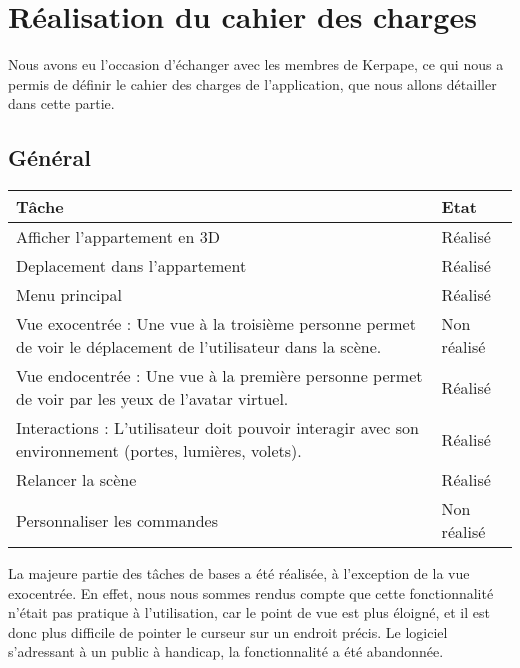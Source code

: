 \section{Réalisation du cahier des charges}
Nous avons eu l'occasion d'échanger avec les membres de Kerpape, ce qui nous a permis de définir le cahier des charges de l'application, que nous allons détailler dans cette partie.

\subsection{Général}
\begin{tabular}{|p{}|p{}|}
	\hline
	Tâche & Etat \\ \hline
	Afficher l'appartement en 3D & Réalisé \\ \hline
	Deplacement dans l'appartement & Réalisé \\ \hline
	Menu principal & Réalisé \\ \hline
	Vue exocentrée : Une vue à la troisième personne permet de voir le déplacement de l'utilisateur dans la scène. & Non réalisé \\ \hline
	Vue endocentrée : Une vue à la première personne permet de voir par les yeux de l'avatar  virtuel. & Réalisé \\ \hline
	Interactions : L'utilisateur doit pouvoir interagir avec son environnement (portes, lumières, volets). & Réalisé \\ \hline
	Relancer la scène & Réalisé \\ \hline
	Personnaliser les commandes & Non réalisé \\ \hline
\end{tabular}


La majeure partie des tâches de bases a été réalisée, à l'exception de la vue exocentrée. 
En effet, nous nous sommes rendus compte que cette fonctionnalité n'était pas pratique à l'utilisation, car le point de vue est plus éloigné, et il est donc plus difficile de pointer le curseur sur un endroit précis.
Le logiciel s'adressant à un public à handicap, la fonctionnalité a été abandonnée.
	
